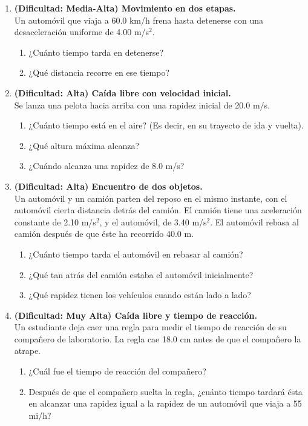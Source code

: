 \documentclass[12pt, a4paper]{article}
\begin{document}
\begin{enumerate}[leftmargin=*, label=\textbf{Problema \arabic*.}, itemsep=2em]
    \item \textbf{(Dificultad: Media-Alta) Movimiento en dos etapas.} \\
    Un automóvil que viaja a 60.0 km/h frena hasta detenerse con una desaceleración uniforme de 4.00 m/s$^2$.
    \begin{enumerate}[label=\alph*)]
        \item ¿Cuánto tiempo tarda en detenerse?
        \item ¿Qué distancia recorre en ese tiempo?
    \end{enumerate}

    \item \textbf{(Dificultad: Alta) Caída libre con velocidad inicial.} \\
    Se lanza una pelota hacia arriba con una rapidez inicial de 20.0 m/s.
    \begin{enumerate}[label=\alph*)]
        \item ¿Cuánto tiempo está en el aire? (Es decir, en su trayecto de ida y vuelta).
        \item ¿Qué altura máxima alcanza?
        \item ¿Cuándo alcanza una rapidez de 8.0 m/s?
    \end{enumerate}

    \item \textbf{(Dificultad: Alta) Encuentro de dos objetos.} \\
    Un automóvil y un camión parten del reposo en el mismo instante, con el automóvil cierta distancia detrás del camión. El camión tiene una aceleración constante de 2.10 m/s$^2$, y el automóvil, de 3.40 m/s$^2$. El automóvil rebasa al camión después de que éste ha recorrido 40.0 m.
    \begin{enumerate}[label=\alph*)]
        \item ¿Cuánto tiempo tarda el automóvil en rebasar al camión?
        \item ¿Qué tan atrás del camión estaba el automóvil inicialmente?
        \item ¿Qué rapidez tienen los vehículos cuando están lado a lado?
    \end{enumerate}

    \item \textbf{(Dificultad: Muy Alta) Caída libre y tiempo de reacción.} \\
    Un estudiante deja caer una regla para medir el tiempo de reacción de su compañero de laboratorio. La regla cae 18.0 cm antes de que el compañero la atrape.
    \begin{enumerate}[label=\alph*)]
        \item ¿Cuál fue el tiempo de reacción del compañero?
        \item Después de que el compañero suelta la regla, ¿cuánto tiempo tardará ésta en alcanzar una rapidez igual a la rapidez de un automóvil que viaja a 55 mi/h?
    \end{enumerate}

\end{enumerate}
\end{document}
